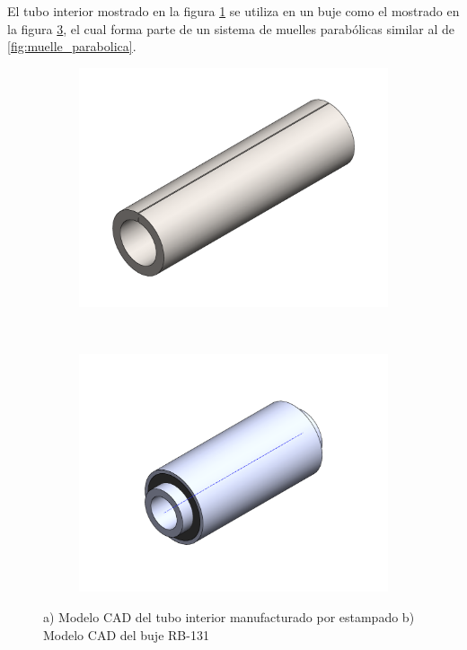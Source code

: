 El tubo interior mostrado en la figura \ref{fig:ti_rb131} se utiliza en un buje como 
el mostrado en la figura \ref{fig:buje_rb131}, el cual forma parte de un sistema de muelles 
parabólicas similar al de \ref{fig:muelle_parabolica}.

\begin{figure}[!h]
\centering
\begin{subfigure}[t]{0.35\textwidth}
\centering
\includegraphics[width=\textwidth]{src/ch3/ti_rb131.pdf}
\caption{}
\label{fig:ti_rb131}
\end{subfigure}
~  
\begin{subfigure}[t]{0.35\textwidth}
\centering
\includegraphics[width=\textwidth]{src/ch3/buje_rb131.pdf}
\caption{}
\label{fig:buje_rb131}
\end{subfigure}
\caption{a) Modelo CAD del tubo interior manufacturado por estampado b) Modelo CAD del buje RB-131}
\end{figure}


